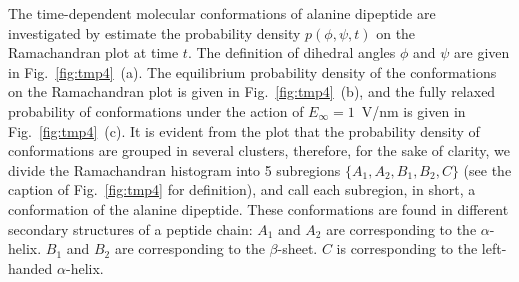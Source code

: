 \documentclass[a4paper,preprint,unsortedaddress,onecolumn]{revtex4-1}
\newcommand{\recheck}[1]{{\color{red} #1}}
\begin{document}
\recheck{
The time-dependent molecular conformations of alanine dipeptide are
investigated by estimate the probability density $p(\phi,\psi,t)$ on
the Ramachandran plot at time $t$. The definition of dihedral
angles $\phi$ and $\psi$ are given in Fig.~\ref{fig:tmp4}~(a).
The equilibrium probability density of
the conformations on the Ramachandran plot
is given in Fig.~\ref{fig:tmp4}~(b), and the fully
relaxed probability of conformations under
the action of $E_{\infty} = 1$~V/nm is
given in Fig.~\ref{fig:tmp4}~(c).  It is evident from the plot that
the probability density of conformations are grouped in several clusters,
therefore, for the sake of clarity, we divide the
Ramachandran histogram into 5 subregions $\{A_1, A_2, B_1, B_2, C\}$
(see the caption of Fig.~\ref{fig:tmp4} for definition), and
call each subregion, in short, a conformation of the alanine dipeptide. 
These conformations
are found in different secondary structures of a peptide chain:
$A_1$ and $A_2$ are
corresponding to the $\alpha$-helix. $B_1$ and $B_2$ are
corresponding to the $\beta$-sheet. $C$ is corresponding to the
left-handed $\alpha$-helix.
}
\end{document}
